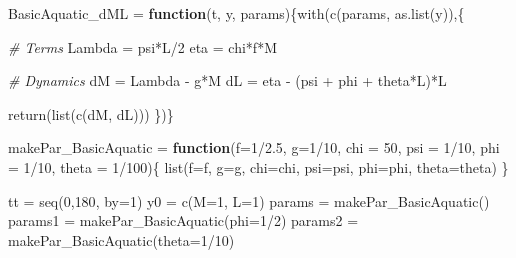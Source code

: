 \documentclass[
]{book}
\newenvironment{Shaded}{\begin{snugshade}}{\end{snugshade}}
\newcommand{\AttributeTok}[1]{\textcolor[rgb]{0.77,0.63,0.00}{#1}}
\newcommand{\CommentTok}[1]{\textcolor[rgb]{0.56,0.35,0.01}{\textit{#1}}}
\newcommand{\ControlFlowTok}[1]{\textcolor[rgb]{0.13,0.29,0.53}{\textbf{#1}}}
\newcommand{\DecValTok}[1]{\textcolor[rgb]{0.00,0.00,0.81}{#1}}
\newcommand{\FloatTok}[1]{\textcolor[rgb]{0.00,0.00,0.81}{#1}}
\newcommand{\FunctionTok}[1]{\textcolor[rgb]{0.00,0.00,0.00}{#1}}
\newcommand{\NormalTok}[1]{#1}
\newcommand{\OtherTok}[1]{\textcolor[rgb]{0.56,0.35,0.01}{#1}}
\newcommand{\SpecialCharTok}[1]{\textcolor[rgb]{0.00,0.00,0.00}{#1}}
\begin{document}
\begin{Shaded}
\begin{Highlighting}[]
\NormalTok{BasicAquatic\_dML }\OtherTok{=} \ControlFlowTok{function}\NormalTok{(t, y, params)\{}\FunctionTok{with}\NormalTok{(}\FunctionTok{c}\NormalTok{(params, }\FunctionTok{as.list}\NormalTok{(y)),\{}
   
  \CommentTok{\# Terms }
\NormalTok{  Lambda }\OtherTok{=}\NormalTok{ psi}\SpecialCharTok{*}\NormalTok{L}\SpecialCharTok{/}\DecValTok{2} 
\NormalTok{  eta }\OtherTok{=}\NormalTok{ chi}\SpecialCharTok{*}\NormalTok{f}\SpecialCharTok{*}\NormalTok{M }
   
  \CommentTok{\# Dynamics }
\NormalTok{  dM }\OtherTok{=}\NormalTok{ Lambda }\SpecialCharTok{{-}}\NormalTok{ g}\SpecialCharTok{*}\NormalTok{M}
\NormalTok{  dL }\OtherTok{=}\NormalTok{ eta }\SpecialCharTok{{-}}\NormalTok{ (psi }\SpecialCharTok{+}\NormalTok{ phi }\SpecialCharTok{+}\NormalTok{ theta}\SpecialCharTok{*}\NormalTok{L)}\SpecialCharTok{*}\NormalTok{L }
  
  \FunctionTok{return}\NormalTok{(}\FunctionTok{list}\NormalTok{(}\FunctionTok{c}\NormalTok{(dM, dL)))}
\NormalTok{\})\} }
\end{Highlighting}
\end{Shaded}

\begin{Shaded}
\begin{Highlighting}[]
\NormalTok{makePar\_BasicAquatic }\OtherTok{=} \ControlFlowTok{function}\NormalTok{(}\AttributeTok{f=}\DecValTok{1}\SpecialCharTok{/}\FloatTok{2.5}\NormalTok{, }\AttributeTok{g=}\DecValTok{1}\SpecialCharTok{/}\DecValTok{10}\NormalTok{, }\AttributeTok{chi =} \DecValTok{50}\NormalTok{, }\AttributeTok{psi =} \DecValTok{1}\SpecialCharTok{/}\DecValTok{10}\NormalTok{, }\AttributeTok{phi =} \DecValTok{1}\SpecialCharTok{/}\DecValTok{10}\NormalTok{, }\AttributeTok{theta =} \DecValTok{1}\SpecialCharTok{/}\DecValTok{100}\NormalTok{)\{}
  \FunctionTok{list}\NormalTok{(}\AttributeTok{f=}\NormalTok{f, }\AttributeTok{g=}\NormalTok{g, }\AttributeTok{chi=}\NormalTok{chi, }\AttributeTok{psi=}\NormalTok{psi, }\AttributeTok{phi=}\NormalTok{phi, }\AttributeTok{theta=}\NormalTok{theta)}
\NormalTok{\}}
\end{Highlighting}
\end{Shaded}

\begin{Shaded}
\begin{Highlighting}[]
\NormalTok{tt }\OtherTok{=} \FunctionTok{seq}\NormalTok{(}\DecValTok{0}\NormalTok{,}\DecValTok{180}\NormalTok{, }\AttributeTok{by=}\DecValTok{1}\NormalTok{) }
\NormalTok{y0 }\OtherTok{=} \FunctionTok{c}\NormalTok{(}\AttributeTok{M=}\DecValTok{1}\NormalTok{, }\AttributeTok{L=}\DecValTok{1}\NormalTok{)}
\NormalTok{params }\OtherTok{=} \FunctionTok{makePar\_BasicAquatic}\NormalTok{()}
\NormalTok{params1 }\OtherTok{=} \FunctionTok{makePar\_BasicAquatic}\NormalTok{(}\AttributeTok{phi=}\DecValTok{1}\SpecialCharTok{/}\DecValTok{2}\NormalTok{)}
\NormalTok{params2 }\OtherTok{=} \FunctionTok{makePar\_BasicAquatic}\NormalTok{(}\AttributeTok{theta=}\DecValTok{1}\SpecialCharTok{/}\DecValTok{10}\NormalTok{)}
\end{Highlighting}
\end{Shaded}
\end{document}
